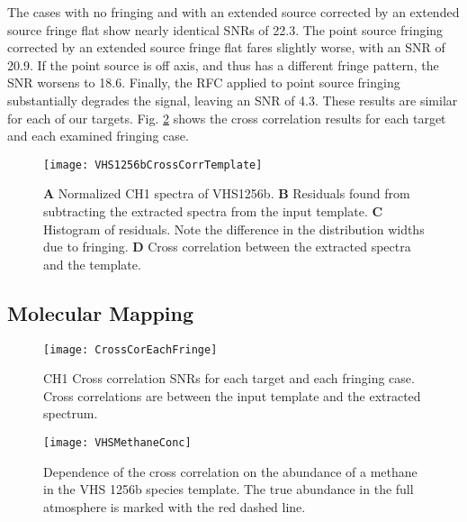 The cases with no fringing and with an extended source corrected by an extended source fringe flat show nearly identical SNRs of 22.3.
The point source fringing corrected by an extended source fringe flat fares slightly worse, with an SNR of 20.9. 
If the point source is off axis, and thus has a different fringe pattern, the SNR worsens to 18.6.
Finally, the RFC applied to point source fringing substantially degrades the signal, leaving an SNR of 4.3.
These results are similar for each of our targets. 
Fig. \ref{fig:ccall} shows the cross correlation results for each target and each examined fringing case.

\begin{figure}[h]
	\centering
	\texttt{[image: VHS1256bCrossCorrTemplate]}
	\caption{\textbf{A} Normalized CH1 spectra of VHS1256b. \textbf{B} Residuals found from subtracting the extracted spectra from the input template. \textbf{C} Histogram of residuals. Note the difference in the distribution widths due to fringing. \textbf{D} Cross correlation between the extracted spectra and the template.}
	\label{fig:CrossCor1D}	
\end{figure}
\clearpage

\subsection{Molecular Mapping}
\begin{figure}[t]
	\texttt{[image: CrossCorEachFringe]}
	\caption{CH1 Cross correlation SNRs for each target and each fringing case. Cross correlations are between the input template and the extracted spectrum.}
	\label{fig:ccall}
\end{figure}
\begin{figure}[t]
	\texttt{[image: VHSMethaneConc]}
	\caption{Dependence of the cross correlation on the abundance of a methane in the VHS 1256b species template. The true abundance in the full atmosphere is marked with the red dashed line.}
	\label{fig:vhsmeth}
\end{figure}
